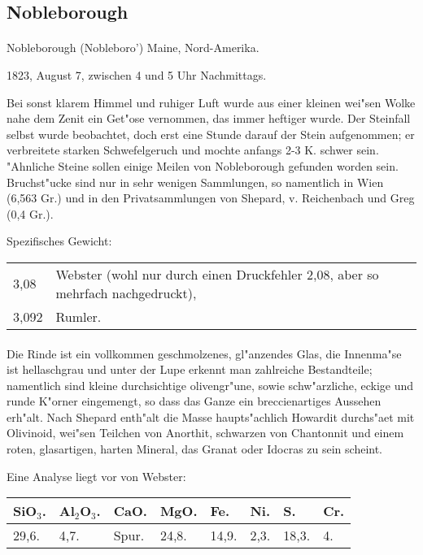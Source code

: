 \documentclass[a4paper, 11pt, oneside]{article}
\begin{document}
\subsection{Nobleborough}
\normalsize
\paragraph{}
Nobleborough (Nobleboro') Maine, Nord-Amerika.

1823, August 7, zwischen 4 und 5 Uhr Nachmittags.

Bei sonst klarem Himmel und ruhiger Luft wurde aus einer kleinen wei"sen Wolke nahe dem Zenit ein Get"ose vernommen, das immer heftiger wurde. Der Steinfall selbst wurde beobachtet, doch erst eine Stunde darauf der Stein aufgenommen; er verbreitete starken Schwefelgeruch und mochte anfangs 2-3 K. schwer sein. "Ahnliche Steine sollen einige Meilen von Nobleborough gefunden worden sein. Bruchst"ucke sind nur in sehr wenigen Sammlungen, so namentlich in Wien (6,563 Gr.) und in den Privatsammlungen von Shepard, v. Reichenbach und Greg (0,4 Gr.).

Spezifisches Gewicht:
\begin{table}[!ht]
    \centering
    \begin{tabular}{l p{50mm}}
        3,08 & Webster (wohl nur durch einen Druckfehler 2,08, aber so mehrfach nachgedruckt),\\
        3,092 & Rumler.
    \end{tabular}
\end{table}
\paragraph{}
Die Rinde ist ein vollkommen geschmolzenes, gl"anzendes Glas, die Innenma"se ist hellaschgrau und unter der Lupe erkennt man zahlreiche Bestandteile; namentlich sind kleine durchsichtige olivengr"une, sowie schw"arzliche, eckige und runde K"orner eingemengt, so dass das Ganze ein breccienartiges Aussehen erh"alt. Nach Shepard enth"alt die Masse haupts"achlich Howardit durchs"aet mit Olivinoid, wei"sen Teilchen von Anorthit, schwarzen von Chantonnit und einem roten, glasartigen, harten Mineral, das Granat oder Idocras zu sein scheint.

Eine Analyse liegt vor von Webster:
\begin{table}[!ht]
    \centering
    \begin{tabular}{l l l l l l l l}
        SiO$_{3}$. & Al$_{2}$O$_{3}$. & CaO. & MgO. & Fe. & Ni. & S. & Cr. \\ \hline
        29,6. & 4,7. & Spur. & 24,8. & 14,9. & 2,3. & 18,3. & 4. \\
    \end{tabular}
\end{table}
\end{document}
